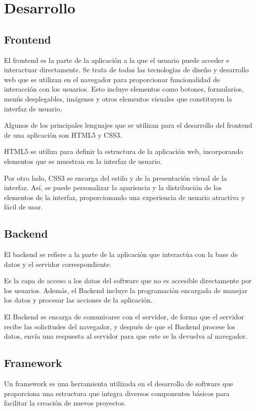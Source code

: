 \section{Desarrollo}

\subsection{Frontend}
\cite{frontendybackend} El frontend es la parte de la aplicación a la que el usuario puede acceder e interactuar directamente. Se trata de todas las tecnologías de diseño y desarrollo web que se utilizan en el navegador para proporcionar funcionalidad de interacción con los usuarios. Esto incluye elementos como botones, formularios, menús desplegables, imágenes y otros elementos visuales que constituyen la interfaz de usuario.

Algunos de los principales lenguajes que se utilizan para el desarrollo del frontend de una aplicación son HTML5 y CSS3.

HTML5 se utiliza para definir la estructura de la aplicación web, incorporando elementos que se muestran en la interfaz de usuario. 

Por otro lado, CSS3 se encarga del estilo y de la presentación visual de la interfaz. Así, se puede personalizar la apariencia y la distribución de los elementos de la interfaz, proporcionando una experiencia de usuario atractiva y fácil de usar.

\subsection{Backend}
\cite{frontendybackend} El backend se refiere a la parte de la aplicación que interactúa con la base de datos y el servidor correspondiente. 

Es la capa de acceso a los datos del software que no es accesible directamente por los usuarios. Además, el Backend incluye la programación encargada de manejar los datos y procesar las acciones de la aplicación. 

\cite{backend} El Backend se encarga de comunicarse con el servidor, de forma que el servidor recibe las solicitudes del navegador, y después de que el Backend procese los datos, envía una respuesta al servidor para que este se la devuelva al navegador.

\subsection{Framework}
\cite{framework} Un framework es una herramienta utilizada en el desarrollo de software que proporciona una estructura que integra diversos componentes básicos para facilitar la creación de nuevos proyectos. 

